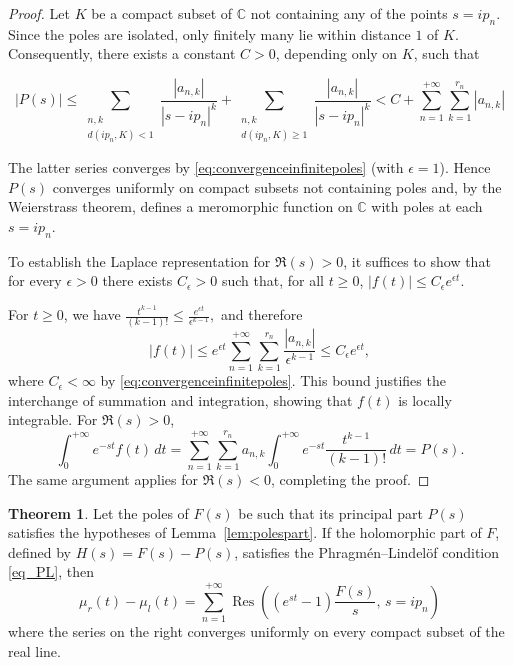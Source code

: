 \documentclass[12pt]{article}
\theoremstyle{definition}
\newtheorem{theorem}{Theorem}[section]
\DeclareMathOperator*{\Res}{Res}
\begin{document}
\begin{proof}
Let $K$ be a compact subset of $\mathbb{C}$ not containing any of the points $s=ip_n$. 
Since the poles are isolated, only finitely many lie within distance $1$ of $K$. Consequently, there exists a constant $C>0$, depending only on $K$, such that

\[ |P(s)| \leq \sum_{\substack{n,k \\ d(ip_n,K)<1}} \frac{|a_{n,k}|}{|s-ip_n|^k}+ \sum_{\substack{n,k \\ d(ip_n,K) \geq1}} \frac{|a_{n,k}|}{|s-ip_n|^k} < C + \sum_{n=1}^{+\infty}\sum_{k=1}^{r_n}|a_{n,k}|\]

The latter series converges by \eqref{eq:convergenceinfinitepoles} (with $\epsilon=1$). 
Hence $P(s)$ converges uniformly on compact subsets not containing poles 
and, by the Weierstrass theorem, defines a meromorphic function on $\mathbb{C}$ with poles at each $s=ip_n$.

To establish the Laplace representation for $\Re(s)>0$, it suffices to show that for every $\epsilon>0$ there exists $C_\epsilon>0$ such that, for all $t \geq 0$, $|f(t)| \le C_\epsilon e^{\epsilon t}.$

For $t\ge 0$, we have $\frac{t^{k-1}}{(k-1)!} \le \frac{e^{\epsilon t}}{\epsilon^{k-1}},$
and therefore
\begin{equation}\label{eq:funi}
|f(t)|
\le e^{\epsilon t}
\sum_{n=1}^{+\infty}\sum_{k=1}^{r_n}
\frac{|a_{n,k}|}{\epsilon^{k-1}}
\le C_\epsilon e^{\epsilon t},
\end{equation}
where $C_\epsilon<\infty$ by \eqref{eq:convergenceinfinitepoles}.
This bound justifies the interchange of  summation and integration, showing that $f(t)$ is locally integrable. For $\Re(s)>0$,
\[
\int_0^{+\infty} e^{-st}f(t)\,dt
=
\sum_{n=1}^{+\infty}\sum_{k=1}^{r_n}
a_{n,k}
\int_0^{+\infty}
e^{-st}\frac{t^{k-1}}{(k-1)!}\,dt
=
P(s).
\]
The same argument applies for $\Re(s)<0$, completing the proof.
\end{proof}



\begin{theorem}\label{thm:infinitepoles}
Let the poles of $F(s)$ be such that its principal part $P(s)$ satisfies the hypotheses of Lemma~\ref{lem:polespart}. 
If the holomorphic part of $F$,  defined by $H(s)=F(s)-P(s)$,
satisfies the Phragmén--Lindelöf condition \eqref{eq_PL}, then
\begin{equation}\label{eq:infinitetransitionformula}
\mu_r(t)-\mu_l(t)
=
\sum_{n=1}^{+\infty}
\Res\!\left((e^{st}-1)\frac{F(s)}{s},\, s=ip_n\right)
\end{equation} where the series on the right converges uniformly on every compact subset of the real line.

\end{theorem}
\end{document}

